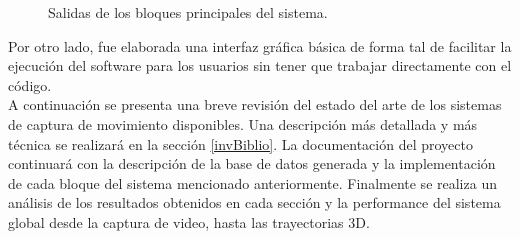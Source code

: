 \begin{figure}[ht!]
  \caption{Salidas de los bloques principales del sistema.}
      \label{ejemplotutiintro}
\end{figure}

Por otro lado, fue elaborada una interfaz gráfica básica de forma tal de facilitar la ejecución del software para los usuarios sin tener que trabajar directamente con el código.
\\ 

A continuación se presenta una breve revisión del estado del arte de los sistemas de captura de movimiento disponibles. Una descripción más detallada y más técnica se realizará en la sección \ref{invBiblio}. La documentación del proyecto continuará con la descripción de la base de datos generada y la implementación de cada bloque del sistema mencionado anteriormente. Finalmente se realiza un análisis de los resultados obtenidos en cada sección y la performance del sistema global desde la captura de video, hasta las trayectorias 3D.

